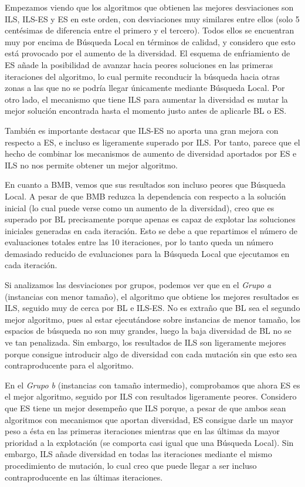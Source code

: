 \documentclass[10pt,a4paper]{article}
\begin{document}
Empezamos viendo que los algoritmos que obtienen las mejores desviaciones son ILS, ILS-ES y ES en este orden, con desviaciones muy similares entre ellos (solo 5 centésimas de diferencia entre el primero y el tercero). Todos ellos se encuentran muy por encima de Búsqueda Local en términos de calidad, y considero que esto está provocado por el aumento de la diversidad. El esquema de enfriamiento de ES añade la posibilidad de avanzar hacia peores soluciones en las primeras iteraciones del algoritmo, lo cual permite reconducir la búsqueda hacia otras zonas a las que no se podría llegar únicamente mediante Búsqueda Local. Por otro lado, el mecanismo que tiene ILS para aumentar la diversidad es mutar la mejor solución encontrada hasta el momento justo antes de aplicarle BL o ES.

También es importante destacar que ILS-ES no aporta una gran mejora con respecto a ES, e incluso es ligeramente superado por ILS. Por tanto, parece que el hecho de combinar los mecanismos de aumento de diversidad aportados por ES e ILS no nos permite obtener un mejor algoritmo.

En cuanto a BMB, vemos que sus resultados son incluso peores que Búsqueda Local. A pesar de que BMB reduzca la dependencia con respecto a la solución inicial (lo cual puede verse como un aumento de la diversidad), creo que es superado por BL precisamente porque apenas es capaz de explotar las soluciones iniciales generadas en cada iteración. Esto se debe a que repartimos el número de evaluaciones totales entre las 10 iteraciones, por lo tanto queda un número demasiado reducido de evaluaciones para la Búsqueda Local que ejecutamos en cada iteración.

Si analizamos las desviaciones por grupos, podemos ver que en el \textit{Grupo a} (instancias con menor tamaño), el algoritmo que obtiene los mejores resultados es ILS, seguido muy de cerca por BL e ILS-ES. No es extraño que BL sea el segundo mejor algoritmo, pues al estar ejecutándose sobre instancias de menor tamaño, los espacios de búsqueda no son muy grandes, luego la baja diversidad de BL no se ve tan penalizada. Sin embargo, los resultados de ILS son ligeramente mejores porque consigue introducir algo de diversidad con cada mutación sin que esto sea contraproducente para el algoritmo.

En el \textit{Grupo b} (instancias con tamaño intermedio), comprobamos que ahora ES es el mejor algoritmo, seguido por ILS con resultados ligeramente peores. Considero que ES tiene un mejor desempeño que ILS porque, a pesar de que ambos sean algoritmos con mecanismos que aportan diversidad, ES consigue darle un mayor peso a ésta en las primeras iteraciones mientras que en las últimas da mayor prioridad a la explotación (se comporta casi igual que una Búsqueda Local). Sin embargo, ILS añade diversidad en todas las iteraciones mediante el mismo procedimiento de mutación, lo cual creo que puede llegar a ser incluso contraproducente en las últimas iteraciones.
\end{document}
